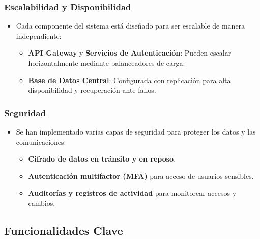 \subsubsection{Escalabilidad y Disponibilidad}
\begin{itemize}
    \item Cada componente del sistema está diseñado para ser escalable de manera independiente:
          \begin{itemize}
              \item \textbf{API Gateway} y \textbf{Servicios de Autenticación}: Pueden escalar horizontalmente mediante balanceadores de carga.
              \item \textbf{Base de Datos Central}: Configurada con replicación para alta disponibilidad y recuperación ante fallos.
          \end{itemize}
\end{itemize}

\subsubsection{Seguridad}
\begin{itemize}
    \item Se han implementado varias capas de seguridad para proteger los datos y las comunicaciones:
          \begin{itemize}
              \item \textbf{Cifrado de datos en tránsito y en reposo}.
              \item \textbf{Autenticación multifactor (MFA)} para acceso de usuarios sensibles.
              \item \textbf{Auditorías y registros de actividad} para monitorear accesos y cambios.
          \end{itemize}
\end{itemize}

\subsection{Funcionalidades Clave}


